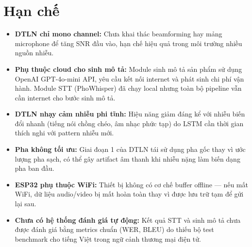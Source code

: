 \section{Hạn chế}

\begin{itemize}
\item
  \textbf{DTLN chỉ mono channel:} Chưa khai thác beamforming hay mảng microphone
  để tăng SNR đầu vào, hạn chế hiệu quả trong môi trường nhiều nguồn nhiễu.
\item
  \textbf{Phụ thuộc cloud cho sinh mô tả:} Module sinh mô tả sản phẩm sử dụng
  OpenAI GPT-4o-mini API, yêu cầu kết nối internet và phát sinh chi phí vận hành.
  Module STT (PhoWhisper) đã chạy local nhưng toàn bộ pipeline vẫn cần internet
  cho bước sinh mô tả.
\item
  \textbf{DTLN nhạy cảm nhiễu phi tĩnh:} Hiệu năng giảm đáng kể với nhiễu
  biến đổi nhanh (tiếng nói chồng chéo, âm nhạc phức tạp) do LSTM cần thời
  gian thích nghi với pattern nhiễu mới.
\item
  \textbf{Pha không tối ưu:} Giai đoạn 1 của DTLN tái sử dụng pha gốc thay vì
  ước lượng pha sạch, có thể gây artifact âm thanh khi nhiễu nặng làm biến
  dạng pha ban đầu.
\item
  \textbf{ESP32 phụ thuộc WiFi:} Thiết bị không có cơ chế buffer offline ---
  nếu mất WiFi, dữ liệu audio/video bị mất hoàn toàn thay vì được lưu trữ
  tạm để gửi lại sau.
\item
  \textbf{Chưa có hệ thống đánh giá tự động:} Kết quả STT và sinh mô tả
  chưa được đánh giá bằng metrics chuẩn (WER, BLEU) do thiếu bộ test
  benchmark cho tiếng Việt trong ngữ cảnh thương mại điện tử.
\end{itemize}
